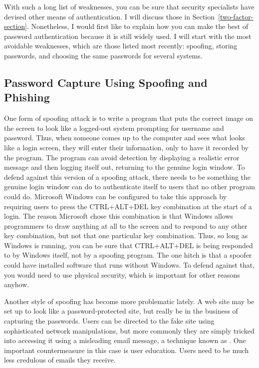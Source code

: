 With such a long list of weaknesses, you can be sure that security
specialists have devised other means of authentication.  I will
discuss those in Section~\ref{two-factor-section}.  Nonetheless, I would first like to explain how you can make the best of password
authentication because it is still widely used.  I will start with the most avoidable weaknesses, which are
those listed most recently: spoofing, storing passwords, and choosing the
same passwords for several systems.

\subsection{Password Capture Using Spoofing and Phishing}

One form of spoofing attack is to write a program that puts the correct
image on the screen to look like a logged-out system prompting for
username and password.  Thus, when someone comes up to the computer
and sees what looks like a login screen, they will enter their
information, only to have it recorded by the program.  The program can
avoid detection by displaying a realistic error message and then
logging itself out, returning to the genuine login window.  To defend
against this version of a spoofing attack, there needs to be something
the genuine login window can do to authenticate itself to users that
no other program could do.  Microsoft Windows can be configured to
take this approach by requiring users to press the CTRL+ALT+DEL
key combination at the start of a login.  The reason Microsoft chose
this combination
is that Windows allows programmers to draw anything at all to the
screen and to respond to any other key combination, but not
that one particular key combination.  Thus, so long as Windows
is running, you can be sure that CTRL+ALT+DEL is being responded
to by Windows itself, not by a spoofing program.  The one hitch is that a
spoofer could have installed software that runs without Windows.  To defend
against that, you would need to use physical security, which is
important for other reasons anyhow.

Another style of spoofing has become more problematic lately.  A web
site may be set up to look like a password-protected site, but really
be in the business of capturing the passwords.  Users can be directed
to the fake site using sophisticated network manipulations, but more
commonly they are simply tricked into accessing it using a misleading
email message, a technique known as .  One important
countermeasure in this case is user education.  Users need to be much
less credulous of emails they receive.

